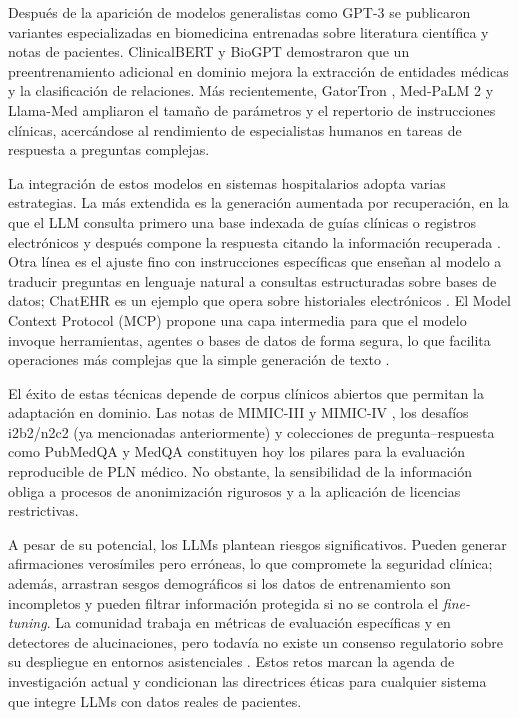 \newpage
Después de la aparición de modelos generalistas como GPT-3 \cite{Brown2020GPT3} se publicaron variantes especializadas en biomedicina entrenadas sobre literatura científica y notas de pacientes. ClinicalBERT \cite{Boag2020_ClinicalBERT} y BioGPT \cite{Lee2020_BioBERT} demostraron que un preentrenamiento adicional en dominio mejora la extracción de entidades médicas y la clasificación de relaciones. Más recientemente, GatorTron \cite{Yang2022_GatorTron}, Med-PaLM 2 \cite{Singhal2023_MedPaLM2} y Llama-Med \cite{Xie2024_MeLLaMA} ampliaron el tamaño de parámetros y el repertorio de instrucciones clínicas, acercándose al rendimiento de especialistas humanos en tareas de respuesta a preguntas complejas.

La integración de estos modelos en sistemas hospitalarios adopta varias estrategias. La más extendida es la generación aumentada por recuperación, en la que el LLM consulta primero una base indexada de guías clínicas o registros electrónicos y después compone la respuesta citando la información recuperada \cite{RAGSurvey2023}. Otra línea es el ajuste fino con instrucciones específicas que enseñan al modelo a traducir preguntas en lenguaje natural a consultas estructuradas sobre bases de datos; ChatEHR es un ejemplo que opera sobre historiales electrónicos \cite{Stanford2025_ChatEHR}. El Model Context Protocol (MCP) propone una capa intermedia para que el modelo invoque herramientas, agentes o bases de datos de forma segura, lo que facilita operaciones más complejas que la simple generación de texto \cite{AnthropicMCP2024}.

El éxito de estas técnicas depende de corpus clínicos abiertos que permitan la adaptación en dominio. Las notas de MIMIC-III y MIMIC-IV \cite{Johnson2023_MIMICIVNote}, los desafíos i2b2/n2c2 \cite{n2c2} (ya mencionadas anteriormente) y colecciones de pregunta–respuesta como PubMedQA \cite{Jin2019_PubMedQA} y MedQA \cite{Jin2020_MedQA} constituyen hoy los pilares para la evaluación reproducible de PLN médico. No obstante, la sensibilidad de la información obliga a procesos de anonimización rigurosos y a la aplicación de licencias restrictivas.

A pesar de su potencial, los LLMs plantean riesgos significativos. Pueden generar afirmaciones verosímiles pero erróneas, lo que compromete la seguridad clínica; además, arrastran sesgos demográficos si los datos de entrenamiento son incompletos y pueden filtrar información protegida si no se controla el \textit{fine-tuning}. La comunidad trabaja en métricas de evaluación específicas y en detectores de alucinaciones, pero todavía no existe un consenso regulatorio sobre su despliegue en entornos asistenciales \cite{Bommasani2022_FoundationModels}. Estos retos marcan la agenda de investigación actual y condicionan las directrices éticas para cualquier sistema que integre LLMs con datos reales de pacientes.


